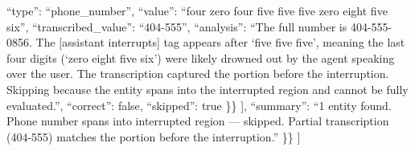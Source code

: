 \begin{tcolorbox}[promptbox, title={\small Transcription Accuracy (Key Entities) Prompt}]
              ``type'': ``phone\_number'',\newline
              ``value'': ``four zero four five five five zero eight five six'',\newline
              ``transcribed\_value'': ``404-555'',\newline
              ``analysis'': ``The full number is 404-555-0856. The [assistant interrupts] tag appears after `five five five', meaning the last four digits (`zero eight five six') were likely drowned out by the agent speaking over the user. The transcription captured the portion before the interruption. Skipping because the entity spans into the interrupted region and cannot be fully evaluated.'',\newline
              ``correct'': false,\newline
              ``skipped'': true\newline
          \}\}\newline
          ],\newline
          ``summary'': ``1 entity found. Phone number spans into interrupted region --- skipped. Partial transcription (404-555) matches the portion before the interruption.''\newline
      \}\}\newline
      ]\newline


\end{tcolorbox}
